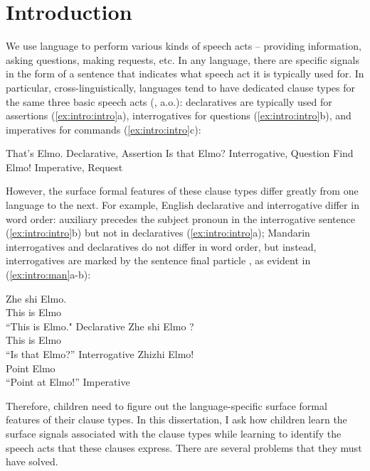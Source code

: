 

\chapter{Introduction}
\label{chap:introduction}

We use language to perform various kinds of speech acts -- providing information, asking questions, making requests, etc. In any language, there are specific signals in the form of a sentence that indicates what speech act it is typically used for. In particular, cross-linguistically, languages tend to have dedicated clause types for the same three basic speech acts (\citealt{sz1985speechact, konig2007, aikhenvald2016, portner2018}, a.o.): declaratives are typically used for assertions (\ref{ex:intro:intro}a), interrogatives for questions (\ref{ex:intro:intro}b), and imperatives for commands (\ref{ex:intro:intro}c):

\bxl
That's Elmo. \hfill Declarative, Assertion
\ex Is that Elmo? \hfill Interrogative, Question
\ex Find Elmo! \hfill Imperative, Request
\exl
\eex


However, the surface formal features of these clause types differ greatly from one language to the next. For example, English declarative and interrogative differ in word order: auxiliary  precedes the subject pronoun in the interrogative sentence (\ref{ex:intro:intro}b) but not in declaratives (\ref{ex:intro:intro}a); Mandarin interrogatives and declaratives do not differ in word order, but instead, interrogatives are marked by the sentence final particle , as evident in (\ref{ex:intro:man}a-b): 

\bxl
\gll Zhe shi Elmo.\\
This is Elmo\\
\trans ``This is Elmo." \hfill Declarative
\ex 
\gll Zhe shi Elmo ?\\
This is Elmo \Sfp\\
\trans ``Is that Elmo?'' \hfill Interrogative
\ex 
\gll Zhizhi Elmo!\\
Point Elmo\\
\trans ``Point at Elmo!'' \hfill Imperative
\exl
\eex

Therefore, children need to figure out the language-specific surface formal features of their clause types. In this dissertation, I ask how children learn the surface signals associated with the clause types while learning to identify the speech acts that these clauses express. There are several problems that they must have solved.

